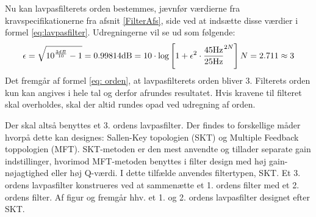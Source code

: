 Nu kan lavpasfilterets orden bestemmes, jævnfør værdierne fra kravspecifikationerne fra afsnit \ref{FilterAfs}, side \pageref{FilterAfs} ved at indsætte disse værdier i formel \eqref{eq:lavpasfilter}. Udregningerne vil se ud som følgende:
\begin{equation}
\epsilon = \sqrt{10^{\frac{3dB}{10}} - 1} = 0.998 \\ \label{eq:orden}
14\text{dB} = 10 \cdot \text{log} \left[1 + \epsilon ^2 \cdot \frac{45\text{Hz}}{25\text{Hz}}^{2N}\right] \\
N = 2.711 \approx 3
\end{equation}
\noindent Det fremgår af formel \eqref{eq: orden}, at lavpasfilterets orden bliver $3$. Filterets orden kun kan angives i hele tal og derfor afrundes resultatet. Hvis kravene til filteret skal overholdes, skal der altid rundes opad ved udregning af orden.

Der skal altså benyttes et 3. ordens lavpasfilter. Der findes to forskellige måder hvorpå dette kan designes: Sallen-Key topologien (SKT) og Multiple Feedback toppologien (MFT). SKT-metoden er den mest anvendte og tillader separate gain indstillinger, hvorimod MFT-metoden benyttes i filter design med høj gain-nøjagtighed eller høj Q-værdi. I dette tilfælde anvendes filtertypen, SKT. Et 3. ordens lavpasfilter konstrueres ved at sammenætte et 1. ordens filter med et 2. ordens filter. Af figur  og  fremgår hhv. et 1. og 2. ordens lavpasfilter designet efter SKT. \cite{Carter2013}
	
